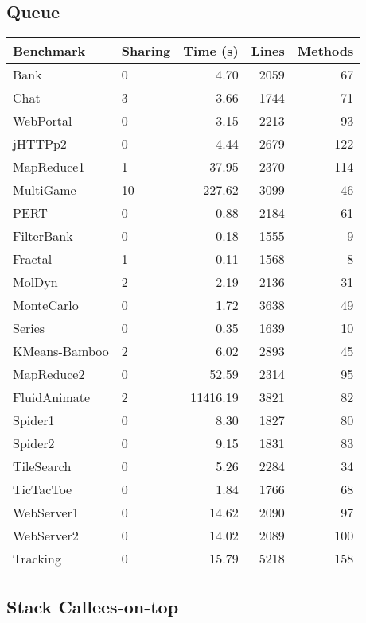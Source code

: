 \documentclass{amsart}[9pt]
\begin{document}
\subsection{Queue}

\begin{tabular}{|l|l|r|r|r|}
\hline
Benchmark & Sharing & Time (s) & Lines & Methods \\
\hline
Bank          & 0  & 4.70     & 2059 & 67 \\
Chat          & 3  & 3.66     & 1744 & 71 \\
WebPortal     & 0  & 3.15     & 2213 & 93 \\
jHTTPp2       & 0  & 4.44     & 2679 & 122 \\
MapReduce1    & 1  & 37.95    & 2370 & 114 \\
MultiGame     & 10 & 227.62   & 3099 & 46 \\
PERT          & 0  & 0.88     & 2184 & 61 \\
FilterBank    & 0  & 0.18     & 1555 & 9 \\
Fractal       & 1  & 0.11     & 1568 & 8 \\
MolDyn        & 2  & 2.19     & 2136 & 31 \\
MonteCarlo    & 0  & 1.72     & 3638 & 49 \\
Series        & 0  & 0.35     & 1639 & 10 \\
KMeans-Bamboo & 2  & 6.02     & 2893 & 45 \\
MapReduce2    & 0  & 52.59    & 2314 & 95 \\
FluidAnimate  & 2  & 11416.19 & 3821 & 82 \\
Spider1       & 0  & 8.30     & 1827 & 80 \\
Spider2       & 0  & 9.15     & 1831 & 83 \\
TileSearch    & 0  & 5.26     & 2284 & 34 \\
TicTacToe     & 0  & 1.84     & 1766 & 68 \\
WebServer1    & 0  & 14.62    & 2090 & 97 \\
WebServer2    & 0  & 14.02    & 2089 & 100 \\
Tracking      & 0  & 15.79    & 5218 & 158 \\
\hline
\end{tabular}



\subsection{Stack Callees-on-top}
\end{document}
